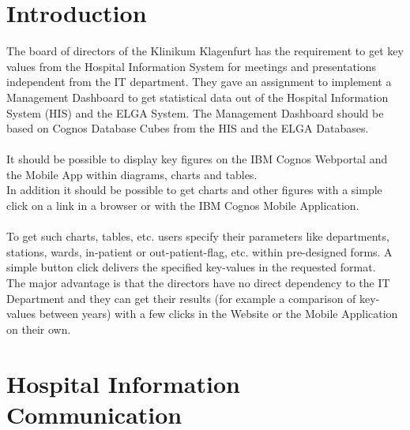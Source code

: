 \documentclass[a4paper]{article}
\begin{document}
	\section{Introduction}
	The board of directors of the Klinikum Klagenfurt has the requirement to get
	key values from the Hospital Information System for
	meetings and presentations independent from the IT department.
	They gave an assignment to implement a Management Dashboard to get statistical
	data out of the Hospital Information System (HIS) and the ELGA System. The Management Dashboard
	should be based on Cognos Database Cubes from the HIS and the ELGA Databases.\\
	\\
	It should be possible to display key figures on the IBM Cognos
	Webportal and the Mobile App within diagrams, charts and tables.\\
	In addition it should be possible to get charts and other figures with a simple
	click on a link in a browser or with the IBM Cognos Mobile Application.\\
	\\
	To get such charts, tables, etc. users specify their parameters like
	departments, stations, wards, in-patient or out-patient-flag, etc. within
	pre-designed forms. A simple button click delivers the specified key-values in
	the requested format.\\
	The major advantage is that the directors have no direct dependency to the
	IT Department and they can get their results (for example a comparison of
	key-values between years) with a few clicks in the Website or the Mobile
	Application on their own.
	\newpage
	
	\section{Hospital Information Communication}
\end{document}
